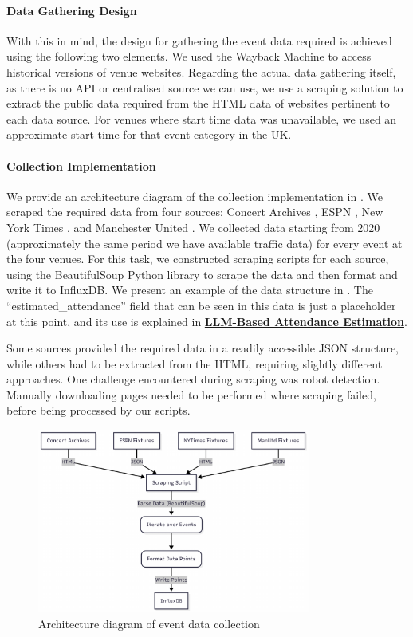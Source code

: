 \paragraph{Data Gathering Design}
With this in mind, the design for gathering the event data required is achieved using the following two elements. We used the Wayback Machine \cite{noauthor_wayback_nodate} to access historical versions of venue websites. Regarding the actual data gathering itself, as there is no API or centralised source we can use, we use a scraping solution to extract the public data required from the HTML data of websites pertinent to each data source. For venues where start time data was unavailable, we used an approximate start time for that event category in the UK.

\paragraph{Collection Implementation}
We provide an architecture diagram of the collection implementation in . We scraped the required data from four sources: Concert Archives \cite{noauthor_concert_nodate}, ESPN \cite{noauthor_espn_nodate}, New York Times \cite{noauthor_NYTimes_nodate}, and Manchester United \cite{noauthor_manutd_nodate}. We collected data starting from 2020 (approximately the same period we have available traffic data) for every event at the four venues. For this task, we constructed scraping scripts for each source, using the BeautifulSoup Python library to scrape the data and then format and write it to InfluxDB. We present an example of the data structure in . The “estimated\_attendance” field that can be seen in this data is just a placeholder at this point, and its use is explained in \textbf{\hyperref[link:llm-attendance-estimation]{LLM-Based Attendance Estimation}}.

Some sources provided the required data in a readily accessible JSON structure, while others had to be extracted from the HTML, requiring slightly different approaches. One challenge encountered during scraping was robot detection. Manually downloading pages needed to be performed where scraping failed, before being processed by our scripts.

\begin{figure}[!ht]
  \centering
  \includegraphics[width=0.8\textwidth]{images/design-implementation/event-scraping.pdf}
  \caption{Architecture diagram of event data collection}
  \label{fig:event-scraping}
\end{figure}

